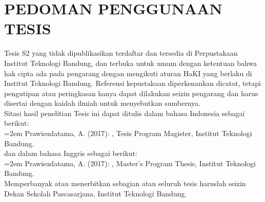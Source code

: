% 
% 

\chapter*{PEDOMAN PENGGUNAAN TESIS}


\noindent Tesis S2 yang tidak dipublikasikan terdaftar dan tersedia di Perpustakaan Institut Teknologi Bandung, dan terbuka untuk umum dengan ketentuan bahwa hak cipta ada pada pengarang dengan mengikuti aturan HaKI yang berlaku di Institut Teknologi Bandung. Referensi kepustakaan diperkenankan dicatat, tetapi pengutipan atau peringkasan hanya dapat dilakukan seizin pengarang dan harus disertai dengan kaidah ilmiah untuk menyebutkan sumbernya.\\


\noindent Sitasi hasil penelitian Tesis ini dapat ditulis dalam bahasa Indonesia sebagai berikut:\\


\hangindent=2em
\noindent Prawisudatama, A. (2017): \textit{\judul}, Tesis Program Magister, Institut Teknologi Bandung.\\


\noindent dan dalam bahasa Inggris sebagai berikut:\\


\hangindent=2em
\noindent Prawisudatama, A. (2017): \textit{\judulInggris}, Master’s Program Thesis, Institut Teknologi Bandung.\\


\noindent Memperbanyak atau menerbitkan sebagian atau seluruh tesis haruslah seizin Dekan Sekolah Pascasarjana, Institut Teknologi Bandung.

\newpage

